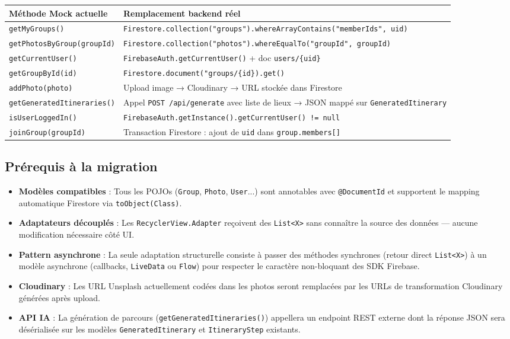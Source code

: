 \documentclass{article}
\begin{document}
\begin{tabular}{|p{6cm}|p{8cm}|}
\hline
\textbf{Méthode Mock actuelle} & \textbf{Remplacement backend réel} \\
\hline
\texttt{getMyGroups()} & \texttt{Firestore.collection("groups")}\newline\texttt{.whereArrayContains("memberIds", uid)} \\
\hline
\texttt{getPhotosByGroup(groupId)} & \texttt{Firestore.collection("photos")}\newline\texttt{.whereEqualTo("groupId", groupId)} \\
\hline
\texttt{getCurrentUser()} & \texttt{FirebaseAuth.getCurrentUser()} + doc \texttt{users/\{uid\}} \\
\hline
\texttt{getGroupById(id)} & \texttt{Firestore.document("groups/\{id\}).get()} \\
\hline
\texttt{addPhoto(photo)} & Upload image → Cloudinary → URL stockée dans Firestore \\
\hline
\texttt{getGeneratedItineraries()} & Appel \texttt{POST /api/generate} avec liste de lieux → JSON mappé sur \texttt{GeneratedItinerary} \\
\hline
\texttt{isUserLoggedIn()} & \texttt{FirebaseAuth.getInstance().getCurrentUser() != null} \\
\hline
\texttt{joinGroup(groupId)} & Transaction Firestore : ajout de \texttt{uid} dans \texttt{group.members[]} \\
\hline
\end{tabular}

\subsection*{Prérequis à la migration}

\begin{itemize}
    \item \textbf{Modèles compatibles} : Tous les POJOs (\texttt{Group}, \texttt{Photo}, \texttt{User}...) sont annotables avec \texttt{@DocumentId} et supportent le mapping automatique Firestore via \texttt{toObject(Class)}.
    \item \textbf{Adaptateurs découplés} : Les \texttt{RecyclerView.Adapter} reçoivent des \texttt{List<X>} sans connaître la source des données — aucune modification nécessaire côté UI.
    \item \textbf{Pattern asynchrone} : La seule adaptation structurelle consiste à passer des méthodes synchrones (retour direct \texttt{List<X>}) à un modèle asynchrone (callbacks, \texttt{LiveData} ou \texttt{Flow}) pour respecter le caractère non-bloquant des SDK Firebase.
    \item \textbf{Cloudinary} : Les URL Unsplash actuellement codées dans les photos seront remplacées par les URLs de transformation Cloudinary générées après upload.
    \item \textbf{API IA} : La génération de parcours (\texttt{getGeneratedItineraries()}) appellera un endpoint REST externe dont la réponse JSON sera désérialisée sur les modèles \texttt{GeneratedItinerary} et \texttt{ItineraryStep} existants.
\end{itemize}
\end{document}
